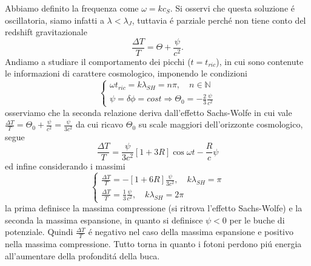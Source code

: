 \documentclass[12pt, a4paper]{article}
\begin{document}
Abbiamo definito la frequenza come $\omega=kc_S$. Si osservi che questa soluzione \'{e} oscillatoria, siamo infatti a $\lambda <\lambda_J$, tuttavia \'{e} parziale perch\'{e} non tiene conto del redshift gravitazionale
\begin{equation}
\frac{\Delta T}{T}=\Theta+\frac{\psi}{c^2}.
\end{equation}
Andiamo a studiare il comportamento dei picchi ($t=t_{ric} $), in cui sono contenute le informazioni di carattere cosmologico, imponendo le condizioni
\begin{equation}
\begin{cases}
\omega t_{ric}=k\lambda_{SH}=n\pi, \quad n\in \mathbb{N}
\\
\psi=\delta \phi=cost \Rightarrow \Theta_0=-\frac{2}{3} \frac{\psi}{c^2}
\end{cases}
\end{equation}
osserviamo che la seconda relazione deriva dall'effetto Sachs-Wolfe in cui vale $\frac{\Delta T}{T}=\Theta_0+\frac{\psi}{c^2}=\frac{\psi}{3c^2}$ da cui ricavo $\Theta_0$ su scale maggiori dell'orizzonte cosmologico, segue
\begin{equation}
\frac{\Delta T}{T}= \frac{\psi}{3c^2}[1+3R] \cos{\omega t}-\frac{R}{c}\psi
\end{equation}
ed infine considerando i massimi
\begin{equation}
\begin{cases}
\frac{\Delta T}{T}=-[1+6R] \frac{\psi}{3c^2}, \quad k\lambda_{SH}=\pi
\\
\frac{\Delta T}{T}=\frac{1}{3} \frac{\psi}{c^2},\quad k\lambda_{SH}=2\pi
\end{cases}
\end{equation}
la prima definisce la massima compressione (si ritrova l'effetto Sachs-Wolfe) e la seconda la massima espansione, in quanto si definisce $\psi<0$ per le buche di potenziale. Quindi $\frac{\Delta T}{T}$ \'{e} negativo nel caso della massima espansione e positivo nella massima compressione. Tutto torna in quanto i fotoni perdono pi\'{u} energia all'aumentare della profondit\'{a} della buca.\\
\end{document}
